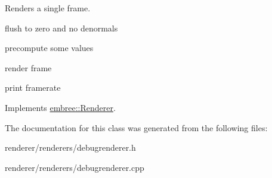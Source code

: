 Renders a single frame. 



flush to zero and no denormals

precompute some values

render frame

print framerate 



Implements \hyperlink{classembree_1_1_renderer_acefb5f55e45bc9b846e1619977926529}{embree::Renderer}.



The documentation for this class was generated from the following files:\begin{DoxyCompactItemize}
\item 
renderer/renderers/debugrenderer.h\item 
renderer/renderers/debugrenderer.cpp\end{DoxyCompactItemize}
